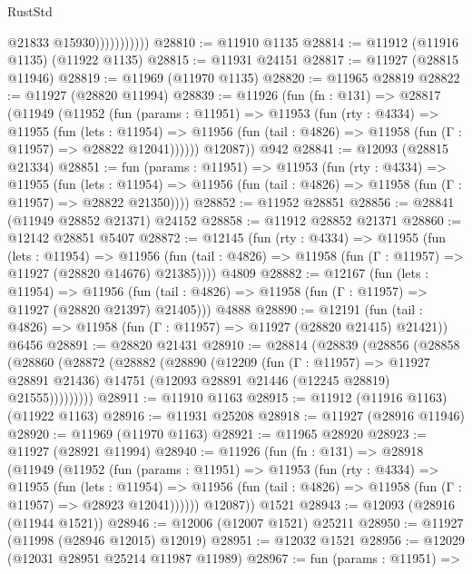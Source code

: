 \begin{lexlean}{RustStd}
\begin{coremodule}
                          @21833
                          @15930)))))))))))
@28810 := @11910 @1135
@28814 := @11912 (@11916 @1135) (@11922 @1135)
@28815 := @11931 @24151
@28817 := @11927 (@28815 @11946)
@28819 := @11969 (@11970 @1135)
@28820 := @11965 @28819
@28822 := @11927 (@28820 @11994)
@28839 := @11926
    (fun (fn : @131) =>
    @28817
      (@11949
        (@11952
          (fun (params : @11951) =>
          @11953
            (fun (rty : @4334) =>
            @11955
              (fun (lets : @11954) =>
              @11956 (fun (tail : @4826) => @11958 (fun (Γ : @11957) => @28822 @12041))))))
        @12087))
    @942
@28841 := @12093 (@28815 @21334)
@28851 := fun (params : @11951) =>
  @11953
    (fun (rty : @4334) =>
    @11955
      (fun (lets : @11954) =>
      @11956 (fun (tail : @4826) => @11958 (fun (Γ : @11957) => @28822 @21350))))
@28852 := @11952 @28851
@28856 := @28841 (@11949 @28852 @21371) @24152
@28858 := @11912 @28852 @21371
@28860 := @12142 @28851 @5407
@28872 := @12145
    (fun (rty : @4334) =>
    @11955
      (fun (lets : @11954) =>
      @11956 (fun (tail : @4826) => @11958 (fun (Γ : @11957) => @11927 (@28820 @14676) @21385))))
    @4809
@28882 := @12167
    (fun (lets : @11954) =>
    @11956 (fun (tail : @4826) => @11958 (fun (Γ : @11957) => @11927 (@28820 @21397) @21405)))
    @4888
@28890 := @12191
    (fun (tail : @4826) => @11958 (fun (Γ : @11957) => @11927 (@28820 @21415) @21421))
    @6456
@28891 := @28820 @21431
@28910 := @28814
    (@28839
      (@28856
        (@28858
          (@28860
            (@28872
              (@28882
                (@28890
                  (@12209
                    (fun (Γ : @11957) => @11927 @28891 @21436)
                    @14751
                    (@12093 @28891 @21446 (@12245 @28819) @21555)))))))))
@28911 := @11910 @1163
@28915 := @11912 (@11916 @1163) (@11922 @1163)
@28916 := @11931 @25208
@28918 := @11927 (@28916 @11946)
@28920 := @11969 (@11970 @1163)
@28921 := @11965 @28920
@28923 := @11927 (@28921 @11994)
@28940 := @11926
    (fun (fn : @131) =>
    @28918
      (@11949
        (@11952
          (fun (params : @11951) =>
          @11953
            (fun (rty : @4334) =>
            @11955
              (fun (lets : @11954) =>
              @11956 (fun (tail : @4826) => @11958 (fun (Γ : @11957) => @28923 @12041))))))
        @12087))
    @1521
@28943 := @12093 (@28916 (@11944 @1521))
@28946 := @12006 (@12007 @1521) @25211
@28950 := @11927 (@11998 (@28946 @12015) @12019)
@28951 := @12032 @1521
@28956 := @12029 (@12031 @28951 @25214 @11987 @11989)
@28967 := fun (params : @11951) =>

\end{coremodule}
\end{lexlean}
